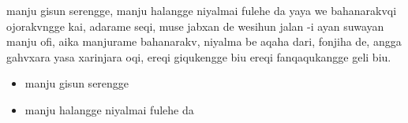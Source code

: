 \documentclass{article}
\begin{document}
manju gisun serengge, manju halangge niyalmai fulehe da yaya we bahanarakvqi ojorakvngge kai, adarame seqi, muse jabxan de wesihun jalan -i ayan suwayan manju ofi, aika manjurame bahanarakv, niyalma be aqaha dari, fonjiha de, angga gahvxara yasa xarinjara oqi, ereqi giqukengge biu ereqi fanqaqukangge geli biu.

\begin{itemize}
  \item manju gisun serengge
  \item manju halangge niyalmai fulehe da
\end{itemize}
\end{document}
